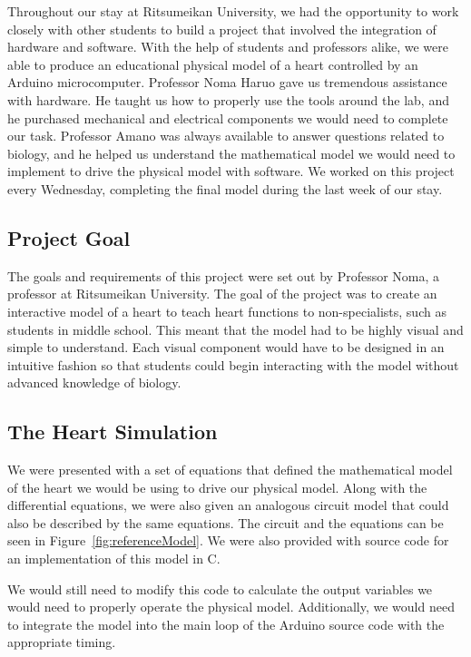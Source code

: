 \documentclass[a4paper, 10pt, american, titlepage]{article}
\begin{document}
Throughout our stay at Ritsumeikan University, we had the opportunity to work
closely with other students to build a project that involved the
integration of hardware and software. With the help of students and professors
alike, we were able to produce an educational physical model of a heart
controlled by an Arduino microcomputer. Professor Noma Haruo gave us tremendous
assistance with hardware. He taught us how to properly use the tools around the
lab, and he purchased mechanical and electrical components we would need to
complete our task. Professor Amano was always available to answer questions
related to biology, and he helped us understand the mathematical model we would
need to implement to drive the physical model with software. We worked on this
project every Wednesday, completing the final model during the last week of our
stay.

\subsection{Project Goal}
\label{sec:projectGoal}

The goals and requirements of this project were set out by Professor Noma, a
professor at Ritsumeikan University. The goal of the project was to create an
interactive model of a heart to teach heart functions to non-specialists, such
as students in middle school. This meant that the model had to be highly visual
and simple to understand. Each visual component would have to be designed in an
intuitive fashion so that students could begin interacting with the model
without advanced knowledge of biology.

\subsection{The Heart Simulation}
\label{sec:theHeartSimulation}

We were presented with a set of equations that defined the mathematical model of
the heart we would be using to drive our physical model. Along with the
differential equations, we were also given an analogous circuit model that could
also be described by the same equations. The circuit and the equations can be
seen in Figure~\ref{fig:referenceModel}. We were also provided with source code
for an implementation of this model in C.

We would still need to modify this code to calculate the output variables we
would need to properly operate the physical model. Additionally, we would need
to integrate the model into the main loop of the Arduino source code with the
appropriate timing.
\end{document}
